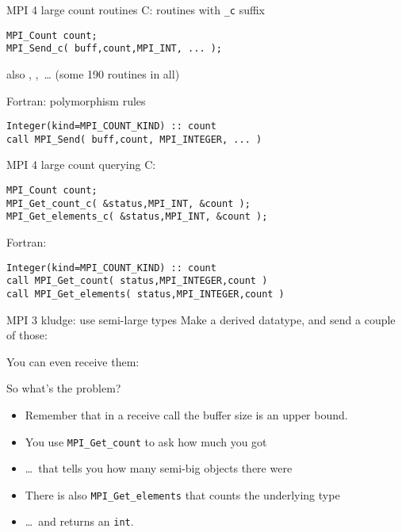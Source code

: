 \begin{numberedframe}{MPI 4 large count routines}
C: routines with \lstinline+_c+ suffix
\begin{lstlisting}
MPI_Count count;
MPI_Send_c( buff,count,MPI_INT, ... );
\end{lstlisting}
\lstset{language=Fortran}
also , ,~\ldots
(some 190 routines in all)

Fortran: polymorphism rules
\begin{lstlisting}
Integer(kind=MPI_COUNT_KIND) :: count
call MPI_Send( buff,count, MPI_INTEGER, ... )
\end{lstlisting}
\lstset{language=C}
\end{numberedframe}


\begin{numberedframe}{MPI 4 large count querying}
C: 
\begin{lstlisting}
MPI_Count count;
MPI_Get_count_c( &status,MPI_INT, &count );
MPI_Get_elements_c( &status,MPI_INT, &count );
\end{lstlisting}
\lstset{language=Fortran}
Fortran: 
\begin{lstlisting}
Integer(kind=MPI_COUNT_KIND) :: count
call MPI_Get_count( status,MPI_INTEGER,count )
call MPI_Get_elements( status,MPI_INTEGER,count )
\end{lstlisting}
\lstset{language=C}
\end{numberedframe}

\begin{numberedframe}{MPI 3 kludge: use semi-large types}
  Make a derived datatype, and send a couple of those:
  

  You can even receive them:

\end{numberedframe}

\begin{numberedframe}{So what's the problem?}
  \begin{itemize}
  \item Remember that in a receive call the buffer size is an upper bound.
  \item You use \lstinline{MPI_Get_count} to ask how much you got
  \item \ldots~that tells you how many semi-big objects there were
  \item There is also \lstinline{MPI_Get_elements} that counts the underlying type
  \item \ldots~and returns an \lstinline{int}.
  \end{itemize}
\end{numberedframe}

